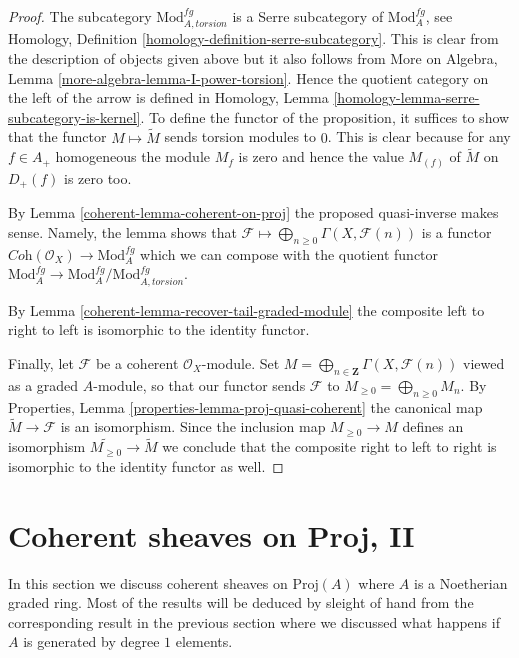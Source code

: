 \begin{proof}

The subcategory $\text{Mod}^{fg}_{A, torsion}$ is a Serre subcategory
of $\text{Mod}^{fg}_A$, see
Homology, Definition \ref{homology-definition-serre-subcategory}.
This is clear from the description of objects given above but it also follows
from More on Algebra, Lemma \ref{more-algebra-lemma-I-power-torsion}.
Hence the quotient category on the left of the arrow is defined
in Homology, Lemma \ref{homology-lemma-serre-subcategory-is-kernel}.
To define the functor of the proposition, it suffices to show that
the functor $M \mapsto \widetilde M$ sends torsion modules to $0$.
This is clear because for any $f \in A_+$ homogeneous the
module $M_f$ is zero and hence the value $M_{(f)}$ of $\widetilde M$
on $D_+(f)$ is zero too.

\medskip\noindent
By Lemma \ref{coherent-lemma-coherent-on-proj} the proposed quasi-inverse
makes sense. Namely, the lemma shows that
$\mathcal{F} \longmapsto \bigoplus_{n \geq 0} \Gamma(X, \mathcal{F}(n))$
is a functor $\textit{Coh}(\mathcal{O}_X) \to \text{Mod}^{fg}_A$
which we can compose with the quotient functor
$\text{Mod}^{fg}_A \to \text{Mod}^{fg}_A/\text{Mod}^{fg}_{A, torsion}$.

\medskip\noindent
By Lemma \ref{coherent-lemma-recover-tail-graded-module}
the composite left to right to left is isomorphic to the identity functor.

\medskip\noindent
Finally, let $\mathcal{F}$ be a coherent $\mathcal{O}_X$-module.
Set $M = \bigoplus_{n \in \mathbf{Z}} \Gamma(X, \mathcal{F}(n))$
viewed as a graded $A$-module, so that our functor sends $\mathcal{F}$ to
$M_{\geq 0} = \bigoplus_{n \geq 0} M_n$.
By Properties, Lemma \ref{properties-lemma-proj-quasi-coherent}
the canonical map $\widetilde M \to \mathcal{F}$
is an isomorphism. Since the inclusion map
$M_{\geq 0} \to M$ defines an isomorphism
$\widetilde{M_{\geq 0}} \to \widetilde M$ we conclude that
the composite right to left to right is isomorphic to the identity
functor as well.
\end{proof}

\section{Coherent sheaves on Proj, II}
\label{coherent-section-coherent-proj-general}
In this section we discuss coherent sheaves on $\text{Proj}(A)$
where $A$ is a Noetherian graded ring. Most of the results will
be deduced by sleight of hand from the corresponding result in the
previous section where we discussed what happens if $A$ is generated
by degree $1$ elements.

